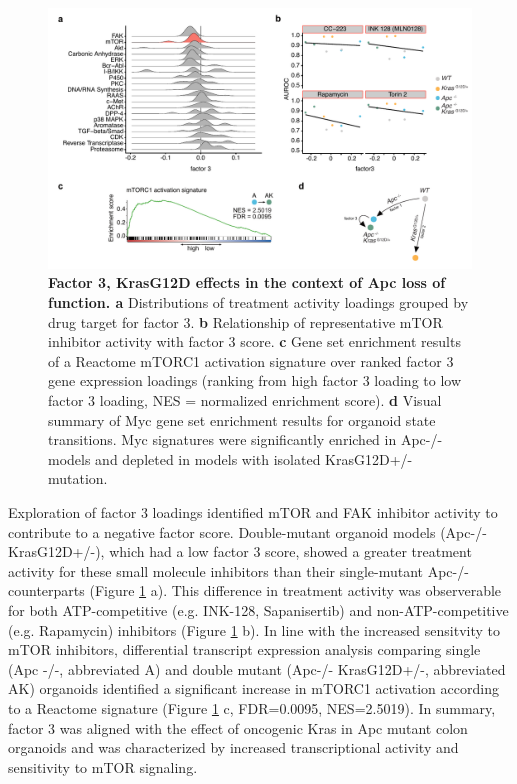 \begin{flushleft}
\begin{figure}[h]
\centering
\includegraphics[scale=0.75,
                keepaspectratio]{figures/adenomaprofiling/pdf/fig_4_1.pdf}
\caption[Factor 3, KrasG12D effects in the context of Apc loss of function]{\textbf{Factor 3, KrasG12D effects in the context of Apc loss of function. a} Distributions of treatment activity loadings grouped by drug target for factor 3. \textbf{b} Relationship of representative mTOR inhibitor activity with factor 3 score. \textbf{c} Gene set enrichment results of a Reactome mTORC1 activation signature over ranked factor 3 gene expression loadings (ranking from high factor 3 loading to low factor 3 loading, NES = normalized enrichment score). \textbf{d} Visual summary of Myc gene set enrichment results for organoid state transitions. Myc signatures were significantly enriched in Apc-/- models and depleted in models with isolated KrasG12D+/- mutation.}
\label{fig_300}
\end{figure}
\bigbreak

Exploration of factor 3 loadings identified mTOR and FAK inhibitor activity to contribute to a negative factor score. Double-mutant organoid models (Apc-/- KrasG12D+/-), which had a low factor 3 score, showed a greater treatment activity for these small molecule inhibitors than their single-mutant Apc-/- counterparts (Figure \ref{fig_300} a). This difference in treatment activity was observerable for both ATP-competitive (e.g. INK-128, Sapanisertib) and non-ATP-competitive (e.g. Rapamycin) inhibitors (Figure \ref{fig_300} b). In line with the increased sensitvity to mTOR inhibitors, differential transcript expression analysis comparing single (Apc -/-, abbreviated A) and double mutant (Apc-/- KrasG12D+/-, abbreviated AK) organoids identified a significant increase in mTORC1 activation according to a Reactome signature (Figure \ref{fig_300} c, FDR=0.0095, NES=2.5019). In summary, factor 3 was aligned with the effect of oncogenic Kras in Apc mutant colon organoids and was characterized by increased transcriptional activity and sensitivity to mTOR signaling.



\end{flushleft}
